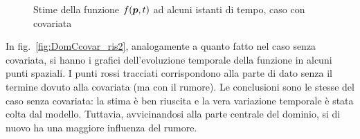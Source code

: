 \documentclass[a4paper,11pt,twoside,openright]{book}							%
\begin{document}
\begin{figure}[H]
{   }
\caption{Stime della funzione $f(\protect\bm{p},t)$ ad alcuni istanti di tempo, caso con covariata}
\label{fig:DomCcovar_ris}
\end{figure}
\newpage
In fig.~\ref{fig:DomCcovar_ris2}, analogamente a quanto fatto nel caso senza covariata, si hanno i grafici dell'evoluzione temporale della funzione in alcuni punti spaziali. I punti rossi tracciati corrispondono alla parte di dato senza il termine dovuto alla covariata (ma con il rumore). Le conclusioni sono le stesse del caso senza covariata: la stima è ben riuscita e la vera variazione temporale è stata colta dal modello. Tuttavia, avvicinandosi alla parte centrale del dominio, si di nuovo ha una maggiore influenza del rumore.
\end{document}
